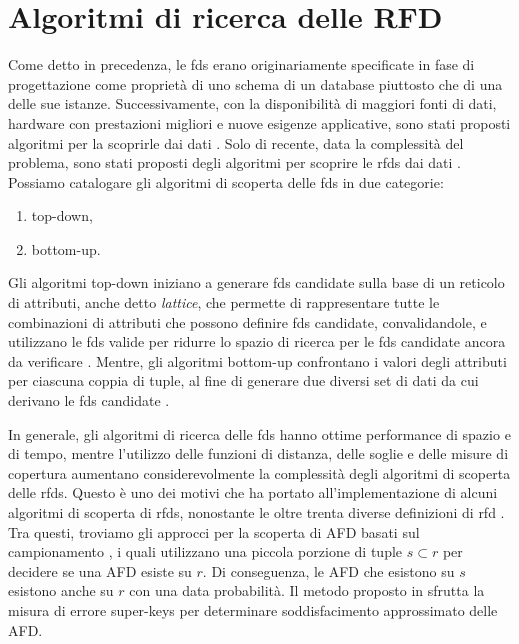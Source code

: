 \section{Algoritmi di ricerca delle RFD}
Come detto in precedenza, le \acrfull{fds} erano originariamente specificate in fase di progettazione come propriet\`{a} di uno schema di un database piuttosto che di una delle sue istanze. Successivamente, con la disponibilit\`{a} di maggiori fonti di dati, hardware con prestazioni migliori e nuove esigenze applicative, sono stati proposti algoritmi per la scoprirle dai dati \cite{efficientdiscoveryfd}. Solo di recente, data la complessit\`{a} del problema, sono stati proposti degli algoritmi per scoprire le \acrfull{rfds} dai dati \cite{rfddiscovery,rfdsurvey,evominingrd,ddiscoveryfromdata,differentialdependencies}. Possiamo catalogare gli algoritmi di scoperta delle \acrfull{fds} in due categorie:
\begin{enumerate}
    \item top-down,
    \item bottom-up.
\end{enumerate}
Gli algoritmi top-down iniziano a generare \acrshort{fds} candidate sulla base di un reticolo di attributi, anche detto \textit{lattice}, che permette di rappresentare tutte le combinazioni di attributi che possono definire \acrshort{fds} candidate, convalidandole, e utilizzano le \acrshort{fds} valide per ridurre lo spazio di ricerca per le \acrshort{fds} candidate ancora da verificare \cite{tanealgfd,fdmine,fun,efficient-fd-discovery}. Mentre, gli algoritmi bottom-up confrontano i valori degli attributi per ciascuna coppia di tuple, al fine di generare due diversi set di dati da cui derivano le \acrshort{fds} candidate \cite{efficientdiscoveryarmstrong,fastfds,dbdependencydiscovery}.\par
In generale, gli algoritmi di ricerca delle \acrshort{fds} hanno ottime performance di spazio e di tempo, mentre l'utilizzo delle funzioni di distanza, delle soglie e delle misure di copertura aumentano considerevolmente la complessit\`{a} degli algoritmi di scoperta delle \acrshort{rfds}. Questo \`{e} uno dei motivi che ha portato all'implementazione di alcuni algoritmi di scoperta di \acrshort{rfds}, nonostante le oltre trenta diverse definizioni di \acrshort{rfd} \cite{rfdsurvey,ddiscoveryfromdata}. Tra questi, troviamo gli approcci per la scoperta di AFD basati sul campionamento \cite{cords,approximateinferencefd}, i quali utilizzano una piccola porzione di tuple $s \subset r$ per decidere se una AFD esiste su $r$. Di conseguenza, le AFD che esistono su $s$ esistono anche su $r$ con una data probabilit\`{a}. Il metodo proposto in \cite{dioscoveryfdindatabase} sfrutta la misura di errore super-keys per determinare soddisfacimento approssimato delle AFD.\par
